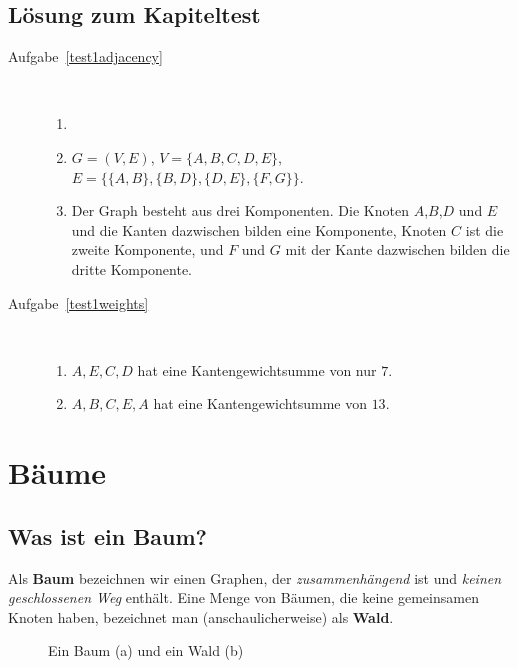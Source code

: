 \documentclass[12pt,a4paper]{report}
\theoremstyle{break}
\theoremstyle{plain}
\begin{document}
\section{L\"{o}sung zum Kapiteltest}
\begin{description}
\item[Aufgabe~\ref{test1adjacency}] \hfill \\[0cm]
\begin{enumerate}
\item \hfill \\[-1cm]
\begin{figure}[H]
\centerline{
}
\end{figure}
\item $G = (V,E)$, $V = \{A, B, C, D, E\}$, $E=\{ \{A, B\}, \{B, D\},\{D, E\},\{F, G\}\}$.
\item Der Graph besteht aus drei Komponenten. Die Knoten $A$,$B$,$D$ und $E$ und die Kanten dazwischen bilden
eine Komponente, Knoten $C$ ist die zweite Komponente, und $F$ und $G$ mit der Kante dazwischen bilden die dritte Komponente.
\end{enumerate}

\item[Aufgabe~\ref{test1weights}] \hfill \\[0cm]
\begin{enumerate}
\item $A, E, C, D$ hat eine Kantengewichtsumme von nur $7$.
\item $A, B, C, E, A$ hat eine Kantengewichtsumme von $13$.
\end{enumerate}
\end{description}

\chapter{B\"{a}ume}

\section{Was ist ein Baum?}

Als \textbf{Baum} bezeichnen wir einen Graphen, der
\emph{zusammenh\"{a}ngend} ist und \emph{keinen geschlossenen Weg}
enth\"{a}lt. Eine Menge von B\"{a}umen, die keine gemeinsamen Knoten
haben, bezeichnet man (anschaulicherweise) als \textbf{Wald}.

\begin{figure}[h!]
\begin{subfigure}[b]{0.35\textwidth}
\caption{}
\end{subfigure}
\begin{subfigure}[b]{0.6\textwidth}
\caption{}
\end{subfigure}
\caption{Ein Baum (a) und ein Wald (b)}
\end{figure}
\end{document}
